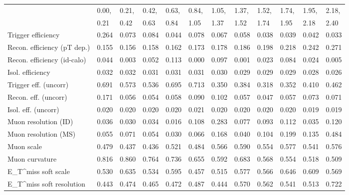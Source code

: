 \begin{tabular}{l|p{0.6cm}p{0.6cm}p{0.6cm}p{0.6cm}p{0.6cm}p{0.6cm}p{0.6cm}p{0.6cm}p{0.6cm}p{0.6cm}p{0.6cm}}
\hline
   & 0.00, & 0.21, & 0.42, & 0.63, & 0.84, & 1.05, & 1.37, & 1.52, & 1.74, & 1.95, & 2.18,  \\ 
   & 0.21 & 0.42 & 0.63 & 0.84 & 1.05 & 1.37 & 1.52 & 1.74 & 1.95 & 2.18 & 2.40  \\ 
\hline
Trigger efficiency                       & 0.264 & 0.073 & 0.084 & 0.044 & 0.078 & 0.067 & 0.058 & 0.038 & 0.039 & 0.042 & 0.033 \\
Recon. efficiency (pT dep.)              & 0.155 & 0.156 & 0.158 & 0.162 & 0.173 & 0.178 & 0.186 & 0.198 & 0.218 & 0.242 & 0.271 \\
Recon. efficiency (id-calo)              & 0.044 & 0.003 & 0.052 & 0.113 & 0.000 & 0.097 & 0.001 & 0.023 & 0.084 & 0.024 & 0.005 \\
Isol. efficiency                         & 0.032 & 0.032 & 0.031 & 0.031 & 0.031 & 0.030 & 0.029 & 0.029 & 0.029 & 0.028 & 0.026 \\
Trigger eff. (uncorr)                    & 0.691 & 0.573 & 0.536 & 0.695 & 0.713 & 0.350 & 0.384 & 0.318 & 0.352 & 0.410 & 0.462 \\
Recon. eff. (uncorr)                     & 0.171 & 0.056 & 0.054 & 0.058 & 0.090 & 0.102 & 0.057 & 0.047 & 0.057 & 0.073 & 0.071 \\
Isol. eff. (uncorr)                      & 0.020 & 0.020 & 0.020 & 0.020 & 0.021 & 0.020 & 0.020 & 0.020 & 0.020 & 0.019 & 0.019 \\
Muon resolution (ID)                     & 0.036 & 0.030 & 0.034 & 0.016 & 0.108 & 0.283 & 0.077 & 0.093 & 0.112 & 0.035 & 0.120 \\
Muon resolution (MS)                     & 0.055 & 0.071 & 0.054 & 0.030 & 0.066 & 0.168 & 0.040 & 0.104 & 0.199 & 0.135 & 0.484 \\
Muon scale                               & 0.479 & 0.437 & 0.436 & 0.521 & 0.484 & 0.566 & 0.590 & 0.554 & 0.577 & 0.541 & 0.576 \\
Muon curvature                           & 0.816 & 0.860 & 0.764 & 0.736 & 0.655 & 0.592 & 0.683 & 0.568 & 0.554 & 0.518 & 0.509 \\
E_{T}^{miss} soft scale                  & 0.530 & 0.635 & 0.534 & 0.595 & 0.457 & 0.515 & 0.577 & 0.566 & 0.646 & 0.609 & 0.569 \\
E_{T}^{miss} soft resolution             & 0.443 & 0.474 & 0.465 & 0.472 & 0.487 & 0.444 & 0.570 & 0.562 & 0.541 & 0.513 & 0.722 \\

\end{tabular}
